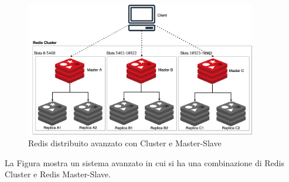 \begin{figure}[H]
    \begin{center}
        \includegraphics[width=0.9\textwidth]{img/cluster:master-slaveRedis}
    \end{center}
    \label{clusterMasterSlave}
\caption{Redis distribuito avanzato con Cluster e Master-Slave}
\end{figure}
La Figura mostra un sistema avanzato in cui si ha una combinazione di Redis Cluster e Redis Master-Slave.